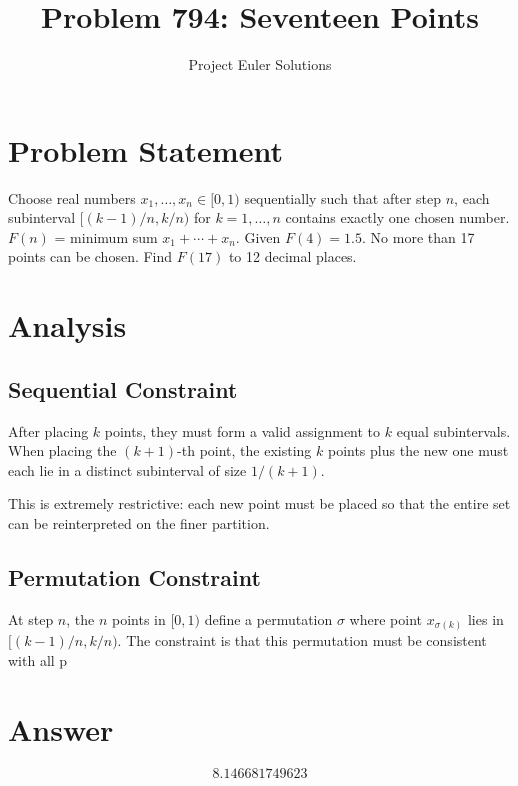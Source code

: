 \documentclass[11pt]{article}
\title{Problem 794: Seventeen Points}
\author{Project Euler Solutions}
\date{}
\begin{document}
\maketitle
\section{Problem Statement}
Choose real numbers $x_1, \ldots, x_n \in [0,1)$ sequentially such that after step $n$, each subinterval $[(k-1)/n, k/n)$ for $k=1,\ldots,n$ contains exactly one chosen number. $F(n)$ = minimum sum $x_1+\cdots+x_n$. Given $F(4)=1.5$. No more than 17 points can be chosen. Find $F(17)$ to 12 decimal places.
\section{Analysis}
\subsection*{Sequential Constraint}

After placing $k$ points, they must form a valid assignment to $k$ equal subintervals. When placing the $(k+1)$-th point, the existing $k$ points plus the new one must each lie in a distinct subinterval of size $1/(k+1)$.

This is extremely restrictive: each new point must be placed so that the entire set can be reinterpreted on the finer partition.

\subsection*{Permutation Constraint}

At step $n$, the $n$ points in $[0,1)$ define a permutation $\sigma$ where point $x_{\sigma(k)}$ lies in $[(k-1)/n, k/n)$. The constraint is that this permutation must be consistent with all p
\section{Answer}

\[
\boxed{8.146681749623}
\]
\end{document}
